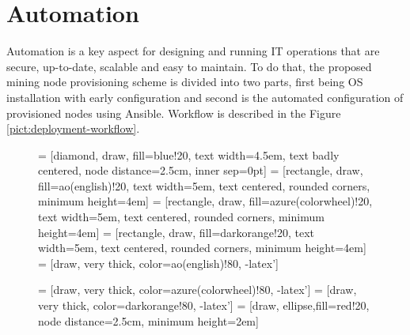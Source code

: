\documentclass[
  printed, %
  table,   %
  lof,     %
  lot,     %
           oneside, color
]{fithesis3}
\renewcommand{\texttt}[1]{%
  \begingroup
  \ttfamily
  \begingroup\lccode`~=`/\lowercase{\endgroup\def~}{/\discretionary{}{}{}}%
  \begingroup\lccode`~=`[\lowercase{\endgroup\def~}{[\discretionary{}{}{}}%
  \begingroup\lccode`~=`.\lowercase{\endgroup\def~}{.\discretionary{}{}{}}%
  \catcode`/=\active\catcode`[=\active\catcode`.=\active
  \scantokens{#1\noexpand}%
  \endgroup
}
\begin{document}
\section{Automation}
Automation is a key aspect for designing and running IT operations that are secure, up-to-date, scalable and easy to maintain. To do that, the proposed mining node provisioning scheme is divided into two parts, first being OS installation with early configuration and second is the automated configuration of provisioned nodes using Ansible. Workflow is described in the Figure \ref{pict:deployment-workflow}.
\vspace{-2em}
\begin{figure}[H]
\center
{} = [diamond, draw, fill=blue!20,
    text width=4.5em, text badly centered, node distance=2.5cm, inner sep=0pt]
 = [rectangle, draw, fill=ao(english)!20,
    text width=5em, text centered, rounded corners, minimum height=4em]
 = [rectangle, draw, fill=azure(colorwheel)!20,
    text width=5em, text centered, rounded corners, minimum height=4em]
 = [rectangle, draw, fill=darkorange!20,
    text width=5em, text centered, rounded corners, minimum height=4em]
 = [draw, very thick, color=ao(english)!80, -latex']

 = [draw, very thick, color=azure(colorwheel)!80, -latex']
 = [draw, very thick, color=darkorange!80, -latex']
 = [draw, ellipse,fill=red!20, node distance=2.5cm,
    minimum height=2em]

\end{figure}
\end{document}

